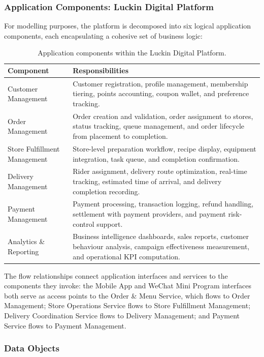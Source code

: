 \documentclass[12pt,a4paper]{article}
\begin{document}
\subsubsection{Application Components: Luckin Digital Platform}

For modelling purposes, the platform is decomposed into six logical application components, each encapsulating a cohesive set of business logic:

\begin{table}[H]
\centering
\caption{Application components within the Luckin Digital Platform.}
\small
\begin{tabularx}{\textwidth}{P{3.6cm}Y}
\toprule
\textbf{Component} & \textbf{Responsibilities} \\
\midrule
Customer Management & Customer registration, profile management, membership tiering, points accounting, coupon wallet, and preference tracking. \\
Order Management & Order creation and validation, order assignment to stores, status tracking, queue management, and order lifecycle from placement to completion. \\
Store Fulfillment Management & Store-level preparation workflow, recipe display, equipment integration, task queue, and completion confirmation. \\
Delivery Management & Rider assignment, delivery route optimization, real-time tracking, estimated time of arrival, and delivery completion recording. \\
Payment Management & Payment processing, transaction logging, refund handling, settlement with payment providers, and payment risk-control support. \\
Analytics \& Reporting & Business intelligence dashboards, sales reports, customer behaviour analysis, campaign effectiveness measurement, and operational KPI computation. \\
\bottomrule
\end{tabularx}
\end{table}

The flow relationships connect application interfaces and services to the components they invoke: the Mobile App and WeChat Mini Program interfaces both serve as access points to the Order \& Menu Service, which flows to Order Management; Store Operations Service flows to Store Fulfillment Management; Delivery Coordination Service flows to Delivery Management; and Payment Service flows to Payment Management.

\subsubsection{Data Objects}
\end{document}
